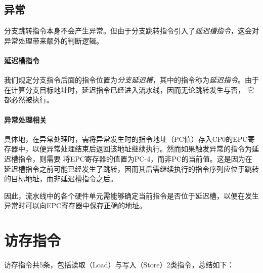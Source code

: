 
\subsection{异常}

分支跳转指令本身不会产生异常。但由于分支跳转指令引入了\emph{延迟槽指令}，这会对异常处理带来额外的判断逻辑。


\paragraph{延迟槽指令} 我们规定分支指令后面的指令位置为\emph{分支延迟槽}，其中的指令称为\emph{延迟指令}。由于在计算分支目标地址时，延迟指令已经进入流水线，因而无论跳转发生与否，
它都必然被执行。

\paragraph{异常处理相关} 具体地，在异常处理时，需将异常发生时的指令地址（PC值）存入CP0的EPC寄存器中，以便异常处理结束后返回该地址继续执行。然而如果触发异常的指令为延迟槽指令，则需要
将EPC寄存器的值置为PC-4，而非PC的当前值。这是因为在延迟槽指令之前可能已经发生了跳转，因而其后需继续执行的指令序列应位于跳转的目标地址，而非延迟槽指令之后。

因此，流水线中的各个硬件单元需能够确定当前指令是否位于延迟槽，以便在发生异常时可以向EPC寄存器中保存正确的地址。

\section{访存指令}

访存指令共5条，包括读取（Load）与写入（Store）2类指令，总结如下：

